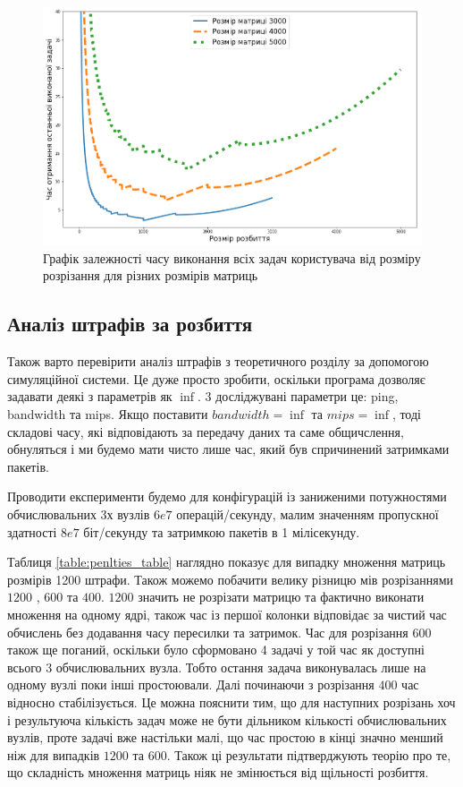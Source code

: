 \begin{figure}[H]
	\centering
	\includegraphics[width=\textwidth]{practice/img/one_user_different_N}
	\caption{Графік залежності часу виконання всіх задач користувача від розміру розрізання для різних розмірів матриць}
	\label{fig:one_diff_N}
\end{figure}

\subsection{Аналіз штрафів за розбиття}

Також варто перевірити аналіз штрафів з теоретичного розділу за допомогою симуляційної системи. Це дуже просто зробити, оскільки програма дозволяє задавати деякі з параметрів як $\inf$. 3 досліджувані параметри це: ping, bandwidth та mips. Якщо поставити $bandwidth=\inf$ та $mips=\inf$, тоді складові часу, які відповідають за передачу даних та саме общичслення, обнуляться і ми будемо мати чисто лише час, який був спричинений затримками пакетів.

Проводити експерименти будемо для конфігурацій із заниженими потужностями обчислювальних 3х вузлів $6e7$ операцій/секунду, малим значенням пропускної здатності $8e7$ біт/секунду та затримкою пакетів в 1 мілісекунду.

Таблиця \ref{table:penlties_table} наглядно показує для випадку множення матриць розмірів 1200 штрафи. Також можемо побачити велику різницю мів розрізаннями $1200$ , $600$ та $400$. $1200$ значить не розрізати матрицю та фактично виконати множення на одному ядрі, також час із першої колонки відповідає за чистий час обчислень без додавання часу пересилки та затримок. Час для розрізання $600$ також ще поганий, оскільки було сформовано 4 задачі у той час як доступні всього 3 обчислювальних вузла. Тобто остання задача виконувалась лише на одному вузлі поки інші простоювали. Далі починаючи з розрізання $400$ час відносно стабілізується. Це можна пояснити тим, що для наступних розрізань хоч і результуюча кількість задач може не бути дільником кількості обчислювальних вузлів, проте задачі вже настільки малі, що час простою в кінці значно менший ніж для випадків $1200$ та $600$. Також ці результати підтверджують теорію про те, що складність множення матриць ніяк не змінюється від щільності розбиття.

